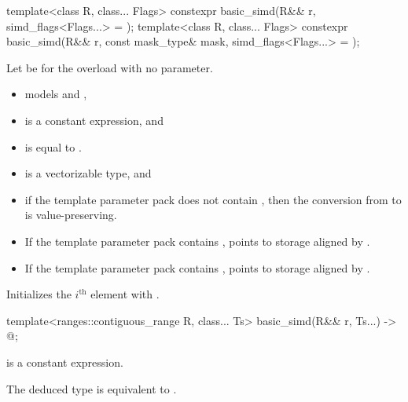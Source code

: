 \begin{itemdecl}
template<class R, class... Flags>
  constexpr basic_simd(R&& r, simd_flags<Flags...> = {});
template<class R, class... Flags>
  constexpr basic_simd(R&& r, const mask_type& mask, simd_flags<Flags...> = {});
\end{itemdecl}

\begin{itemdescr}
  \pnum
  Let  be  for the overload with no  parameter.

  \pnum\constraints
  \begin{itemize}
    \item {} models  and ,
    \item {} is a constant expression, and
    \item {} is equal to .
  \end{itemize}

  \pnum\mandates
  \begin{itemize}
    \item {} is a vectorizable type, and
    \item if the template parameter pack  does not contain \tcode{\convertflag}, then
      the conversion from  to  is
      value-preserving.
  \end{itemize}

  \pnum\expects
  \begin{itemize}
    \item If the template parameter pack  contains \tcode{\alignedflag},
       points to storage aligned by .
    \item If the template parameter pack  contains ,
       points to storage aligned by .
  \end{itemize}

  \pnum\effects
    Initializes the $i^\text{th}$ element with  \foralli.
\end{itemdescr}

\begin{itemdecl}
template<ranges::contiguous_range R, class... Ts>
  basic_simd(R&& r, Ts...) -> @\seebelow@;
\end{itemdecl}
\begin{itemdescr}
  \pnum\constraints
   is a constant expression.

  \pnum\remarks
  The deduced type is equivalent to .
\end{itemdescr}

